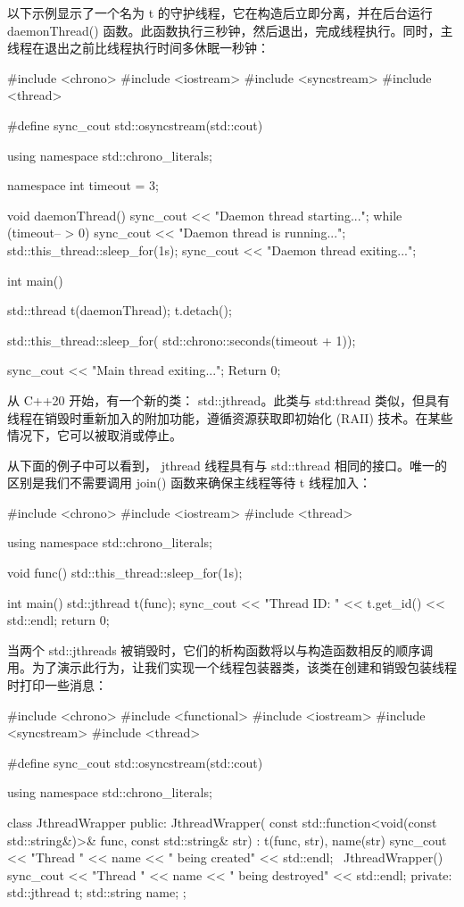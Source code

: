 以下示例显示了一个名为 t 的守护线程，它在构造后立即分离，并在后台运行 daemonThread() 函数。此函数执行三秒钟，然后退出，完成线程执行。同时，主线程在退出之前比线程执行时间多休眠一秒钟：

\begin{cpp}
#include <chrono>
#include <iostream>
#include <syncstream>
#include <thread>

#define sync_cout std::osyncstream(std::cout)

using namespace std::chrono_literals;

namespace {
    int timeout = 3;
}

void daemonThread() {
    sync_cout << "Daemon thread starting...\n";
    while (timeout-- > 0) {
        sync_cout << "Daemon thread is running...\n";
        std::this_thread::sleep_for(1s);
    }
    sync_cout << "Daemon thread exiting...\n";
}

int main() {
    std::thread t(daemonThread);
    t.detach();

    std::this_thread::sleep_for(
        std::chrono::seconds(timeout + 1));

    sync_cout << "Main thread exiting...\n";
    Return 0;
}
\end{cpp}


从 C++20 开始，有一个新的类： std::jthread。此类与 std:thread 类似，但具有线程在销毁时重新加入的附加功能，遵循资源获取即初始化 (RAII) 技术。在某些情况下，它可以被取消或停止。

从下面的例子中可以看到， jthread 线程具有与 std::thread 相同的接口。唯一的区别是我们不需要调用 join() 函数来确保主线程等待 t 线程加入：

\begin{cpp}
#include <chrono>
#include <iostream>
#include <thread>

using namespace std::chrono_literals;

void func() {
    std::this_thread::sleep_for(1s);
}

int main() {
    std::jthread t(func);
    sync_cout << "Thread ID: " << t.get_id() << std::endl;
    return 0;
}
\end{cpp}

当两个 std::jthreads 被销毁时，它们的析构函数将以与构造函数相反的顺序调用。为了演示此行为，让我们实现一个线程包装器类，该类在创建和销毁包装线程时打印一些消息：

\begin{cpp}
#include <chrono>
#include <functional>
#include <iostream>
#include <syncstream>
#include <thread>

#define sync_cout std::osyncstream(std::cout)

using namespace std::chrono_literals;

class JthreadWrapper {
public:
    JthreadWrapper(
    const std::function<void(const std::string&)>& func,
    const std::string& str)
    : t(func, str), name(str) {
        sync_cout << "Thread " << name
                  << " being created" << std::endl;
    }
    ~JthreadWrapper() {
        sync_cout << "Thread " << name
                  << " being destroyed" << std::endl;
    }
private:
    std::jthread t;
    std::string name;
};
\end{cpp}

